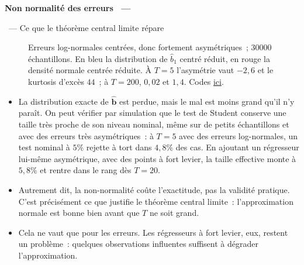 \documentclass[10pt,a4paper]{article}
\makeatletter
\newcommand{\coursfile}{chapitre-2}
\newcommand{\HEAD}{HEAD}%
\newcommand{\repourl}{https://github.com/stepan-a/econometrics}
\newcommand{\coderef}[1]{\href{\repourl/blob/\HEAD/routines/\coursfile/#1}{ici}}
\theoremstyle{definition}
\renewcommand{\newline}{\unskip\par\vspace{1.5pt}}
\newenvironment{frame}[1][]{\par}{\par}
\newcommand{\frameheadrule}{%
  \par\nobreak\vspace{1pt}{\color{ctitle}\hrule height 0.6pt}\nobreak\vspace{4pt}}
\newcommand{\frametitle}[1]{%
  \par\addvspace{8pt plus 2pt}\needspace{6\baselineskip}%
  \noindent\begingroup\color{ctitle}\sffamily\bfseries\large #1\endgroup
  \@ifnextchar\framesubtitle{}{\frameheadrule}}
\newcommand{\framesubtitle}[1]{%
  \begingroup\color{ctitle}\sffamily\normalsize\ --- #1\endgroup\frameheadrule}
\makeatother
\begin{document}
\begin{frame}[c]
  \frametitle{Non normalité des erreurs}
  \framesubtitle{Ce que le théorème central limite répare}

  \begin{figure}
    \centering
    \caption{Erreurs log-normales centrées, donc fortement asymétriques~; $30000$
      échantillons. En bleu la distribution de $\hat b_1$ centré réduit, en rouge la
      densité normale centrée réduite. À $T=5$ l'asymétrie vaut $-2{,}6$ et le kurtosis
      d'excès $44$~; à $T=200$, $0{,}02$ et $1{,}4$. Codes
      \coderef{normalite-asymptotique-bhat.py}.}
  \end{figure}

\end{frame}


\begin{notes}

  \begin{itemize}

  \item La distribution exacte de $\hat{\mathbf b}$ est perdue, mais le mal est moins
    grand qu'il n'y paraît. On peut vérifier par simulation que le test de Student
    conserve une taille très proche de son niveau nominal, même sur de petits
    échantillons et avec des erreurs très asymétriques~: à $T=5$ avec des erreurs
    log-normales, un test nominal à $5\%$ rejette à tort dans $4{,}8\%$ des cas. En
    ajoutant un régresseur lui-même asymétrique, avec des points à fort levier, la
    taille effective monte à $5{,}8\%$ et rentre dans le rang dès $T=20$.\newline

  \item Autrement dit, la non-normalité coûte l'exactitude, pas la validité pratique.
    C'est précisément ce que justifie le théorème central limite~: l'approximation
    normale est bonne bien avant que $T$ ne soit grand.\newline

  \item[\dbend] Cela ne vaut que pour les erreurs. Les régresseurs à fort levier, eux,
    restent un problème~: quelques observations influentes suffisent à dégrader
    l'approximation.

  \end{itemize}

\end{notes}
\end{document}
